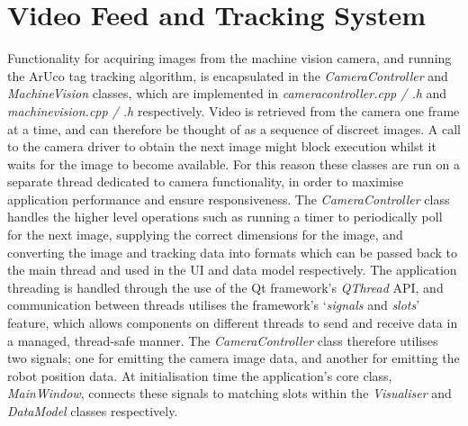 
\section{Video Feed and Tracking System} \label{VideoFeedAndTrackingSystem}
Functionality for acquiring images from the machine vision camera, and running the ArUco tag tracking algorithm, is encapsulated in the \textit{CameraController} and \textit{MachineVision} classes, which are implemented in \textit{cameracontroller.cpp / .h} and \textit{machinevision.cpp / .h} respectively. Video is retrieved from the camera one frame at a time, and can therefore be thought of as a sequence of discreet images. A call to the camera driver to obtain the next image might block execution whilst it waits for the image to become available. For this reason these classes are run on a separate thread dedicated to camera functionality, in order to maximise application performance and ensure responsiveness. The \textit{CameraController} class handles the higher level operations such as running a timer to periodically poll for the next image, supplying the correct dimensions for the image, and converting the image and tracking data into formats which can be passed back to the main thread and used in the UI and data model respectively. The application threading is handled through the use of the Qt framework's \textit{QThread} API, and communication between threads utilises the framework's `\textit{signals} and \textit{slots}' feature, which allows components on different threads to send and receive data in a managed, thread-safe manner. The \textit{CameraController} class therefore utilises two signals; one for emitting the camera image data, and another for emitting the robot position data. At initialisation time the application's core class, \textit{MainWindow}, connects these signals to matching slots within the \textit{Visualiser} and \textit{DataModel} classes respectively.


